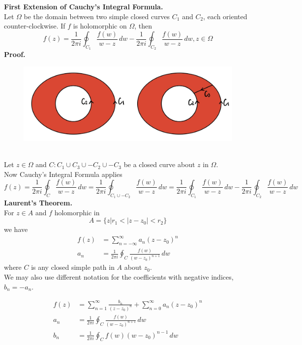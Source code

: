 \documentclass[11pt]{article}
\begin{document}
\textbf{First Extension of Cauchy's Integral Formula.} \\
Let $\Omega$ be the domain between two simple closed curves $C_1$ and $C_2$, each oriented counter-clockwise. If $f$ is holomorphic on $\Omega$, then
$$f(z) = \frac{1}{2\pi i} \oint_{C_1} \frac{f(w)}{w - z} \,dw - \frac{1}{2\pi i} \oint_{C_2} \frac{f(w)}{w - z} \,dw, z \in \Omega$$
\textbf{Proof.}\\
\begin{figure}[h]
\includegraphics[scale=0.2]{p1cif} 
\centering
\end{figure}
\\
Let $z \in \Omega$ and $C: C_1 \cup C_3 \cup -C_2 \cup -C_3$ be a closed curve about $z$ in $\Omega$. \\
Now Cauchy's Integral Formula applies
$$ f(z) = \frac{1}{2\pi i}\oint_C \frac{f(w)}{w - z} \, dw = \frac{1}{2\pi i}\oint_{C_1\cup -C_2} \frac{f(w)}{w - z} \,dw = \frac{1}{2\pi i} \oint_{C_1} \frac{f(w)}{w - z} \,dw - \frac{1}{2\pi i} \oint_{C_2} \frac{f(w)}{w - z} \,dw$$
\newline
\textbf{Laurent's Theorem.} \\
For $z \in A$ and $f$ holomorphic in 
$$A = \{z|r_1 < |z - z_0| < r_2\}$$
we have 
\begin{align*}
f(z) &= \sum_{n = -\infty}^{\infty} a_n(z - z_0)^n \\
a_n & = \frac{1}{2\pi i}\oint_C \frac{f(w)}{(w - z_0)^{n + 1}}\, dw
\end{align*}
where $C$ is any closed simple path in $A$ about $z_0$. \\
We may also use different notation for the coefficients with negative indices, $b_n = -a_n$. \\
\newline
\begin{minipage}{.5\textwidth}
       \begin{align*}
	f(z) &= \sum_{n = 1}^{\infty}\frac{b_n}{(z - z_0)^n} + \sum_{n = 0}^{\infty} a_n (z-z_0)^n \\
	a_n &= \frac{1}{2\pi i}\oint_C \frac{f(w)}{(w - z_0)^{n + 1}} \, dw \\
	b_n &= \frac{1}{2\pi i}\oint_C f(w)(w - z_0)^{n - 1} \, dw \\
	\end{align*}
  \end{minipage}%
\end{document}
